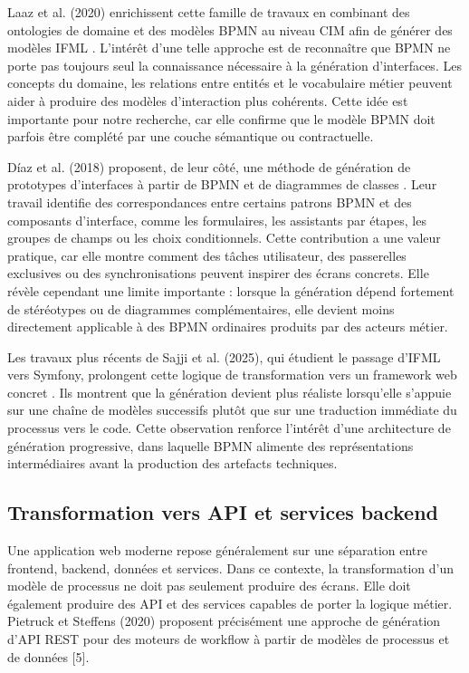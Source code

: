 Laaz et al. (2020) enrichissent cette famille de travaux en combinant des ontologies de domaine et des modèles BPMN au niveau CIM afin de générer des modèles IFML \cite{laaz2020}. L'intérêt d'une telle approche est de reconnaître que BPMN ne porte pas toujours seul la connaissance nécessaire à la génération d'interfaces. Les concepts du domaine, les relations entre entités et le vocabulaire métier peuvent aider à produire des modèles d'interaction plus cohérents. Cette idée est importante pour notre recherche, car elle confirme que le modèle BPMN doit parfois être complété par une couche sémantique ou contractuelle.

Díaz et al. (2018) proposent, de leur côté, une méthode de génération de prototypes d'interfaces à partir de BPMN et de diagrammes de classes \cite{diaz2018}. Leur travail identifie des correspondances entre certains patrons BPMN et des composants d'interface, comme les formulaires, les assistants par étapes, les groupes de champs ou les choix conditionnels. Cette contribution a une valeur pratique, car elle montre comment des tâches utilisateur, des passerelles exclusives ou des synchronisations peuvent inspirer des écrans concrets. Elle révèle cependant une limite importante : lorsque la génération dépend fortement de stéréotypes ou de diagrammes complémentaires, elle devient moins directement applicable à des BPMN ordinaires produits par des acteurs métier.

Les travaux plus récents de Sajji et al. (2025), qui étudient le passage d'IFML vers Symfony, prolongent cette logique de transformation vers un framework web concret \cite{sajji2025}. Ils montrent que la génération devient plus réaliste lorsqu'elle s'appuie sur une chaîne de modèles successifs plutôt que sur une traduction immédiate du processus vers le code. Cette observation renforce l'intérêt d'une architecture de génération progressive, dans laquelle BPMN alimente des représentations intermédiaires avant la production des artefacts techniques.

\subsection{Transformation vers API et services backend}

Une application web moderne repose généralement sur une séparation entre frontend, backend, données et services. Dans ce contexte, la transformation d'un modèle de processus ne doit pas seulement produire des écrans. Elle doit également produire des API et des services capables de porter la logique métier. Pietruck et Steffens (2020) proposent précisément une approche de génération d'API REST pour des moteurs de workflow à partir de modèles de processus et de données [5].

